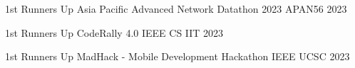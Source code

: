 










\begin{cvhonors}

  \cvhonor
  {1st Runners Up} %
  {Asia Pacific Advanced Network Datathon 2023} %
  {APAN56} %
  {2023} %

  \cvhonor
  {1st Runners Up} %
  {CodeRally 4.0} %
  {IEEE CS IIT} %
  {2023} %


  \cvhonor
  {1st Runners Up} %
  {MadHack - Mobile Development Hackathon} %
  {IEEE UCSC} %
  {2023} %

\end{cvhonors}



